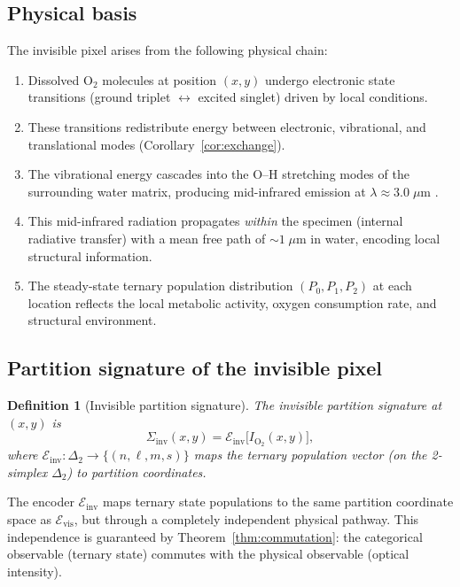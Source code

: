 \documentclass[11pt,twocolumn,a4paper]{article}
\newtheorem{definition}{Definition}
\newcommand{\Siginv}{\Sigma_{\mathrm{inv}}}
\begin{document}
\subsection{Physical basis}

The invisible pixel arises from the following physical chain:
\begin{enumerate}
\item Dissolved O$_2$ molecules at position $(x,y)$ undergo electronic state transitions (ground triplet $\leftrightarrow$ excited singlet) driven by local conditions.
\item These transitions redistribute energy between electronic, vibrational, and translational modes (Corollary~\ref{cor:exchange}).
\item The vibrational energy cascades into the O--H stretching modes of the surrounding water matrix, producing mid-infrared emission at $\lambda \approx 3.0\;\mu$m \citep{Falk1984,Bertie1996}.
\item This mid-infrared radiation propagates \emph{within} the specimen (internal radiative transfer) with a mean free path of ${\sim}1\;\mu$m in water, encoding local structural information.
\item The steady-state ternary population distribution $(P_0, P_1, P_2)$ at each location reflects the local metabolic activity, oxygen consumption rate, and structural environment.
\end{enumerate}

\subsection{Partition signature of the invisible pixel}

\begin{definition}[Invisible partition signature]\label{def:invsig}
The invisible partition signature at $(x,y)$ is
\begin{equation}\label{eq:invsig}
\Siginv(x,y) = \mathcal{E}_{\mathrm{inv}}\bigl[I_{\mathrm{O}_2}(x,y)\bigr],
\end{equation}
where $\mathcal{E}_{\mathrm{inv}}: \Delta_2 \to \{(n,\ell,m,s)\}$ maps the ternary population vector (on the 2-simplex $\Delta_2$) to partition coordinates.
\end{definition}

The encoder $\mathcal{E}_{\mathrm{inv}}$ maps ternary state populations to the same partition coordinate space as $\mathcal{E}_{\mathrm{vis}}$, but through a completely independent physical pathway.
This independence is guaranteed by Theorem~\ref{thm:commutation}: the categorical observable (ternary state) commutes with the physical observable (optical intensity).
\end{document}
